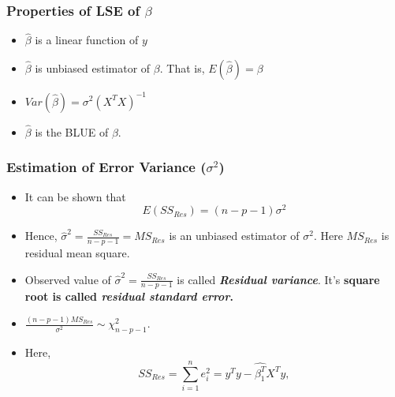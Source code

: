 \documentclass[10pt]{beamer} %
\begin{document}
\begin{frame}
   \frametitle{Properties of LSE of $\beta$}
   \begin{itemize}
      \item $\hat{\beta}$ is a linear function of $y$
         \vspace{0.5cm}
      \item $\hat \beta$ is unbiased estimator of $\beta$. That is, $E(\hat \beta) = \beta$
         \vspace{0.5cm}
      \item $
         Var \left( \hat \beta \right) = \sigma^2 (X^TX)^{-1}$
         \vspace{0.5cm}
      \item ${\hat \beta}$ is the BLUE of $\beta$. 
   \end{itemize}	
\end{frame}


\begin{frame}
	\frametitle{Estimation of Error Variance ($\sigma^2$)}
	\begin{itemize}
		\item It can be shown that 
		$$E(SS_{Res}) = (n-p-1) \sigma^2$$
		\vspace{0.01cm}
		
		\item Hence, $\hat\sigma^2 = \frac{SS_{Res}}{n-p-1} = MS_{Res}$ is an unbiased estimator of $\sigma^2$. Here $MS_{Res}$ is residual mean square. 
		\vspace{0.25cm}
		
		\item Observed value of $\hat\sigma^2 = \frac{SS_{Res}}{n-p-1}$ is called \emph{\textbf{Residual variance}}. It's \textbf{square root is called \emph{residual standard error}.}
		\bigskip
\item $\frac{(n-p-1) MS_{Res}}{\sigma^2} \sim \chi_{n-p-1}^2$. 
		\vspace{0.25cm}
		
		\item Here, 
		$$SS_{Res} = \sum_{i=1}^{n} e_{i}^{2} = y^{T}y - \hat{\beta_1^T} X^Ty, $$ 
	\end{itemize}
\end{frame}
\end{document}
